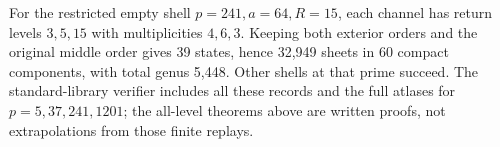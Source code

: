 \documentclass[10pt,reqno]{amsart}
\begin{document}
For the restricted empty shell $p=241,a=64,R=15$, each channel has return
levels $3,5,15$ with multiplicities $4,6,3$. Keeping both exterior orders
and the original middle order gives 39 states, hence 32,949 sheets in
60 compact components, with total genus 5,448. Other shells at that prime
succeed. The standard-library verifier includes all these records and the
full atlases for $p=5,37,241,1201$; the all-level theorems above are written
proofs, not extrapolations from those finite replays.

\end{document}
